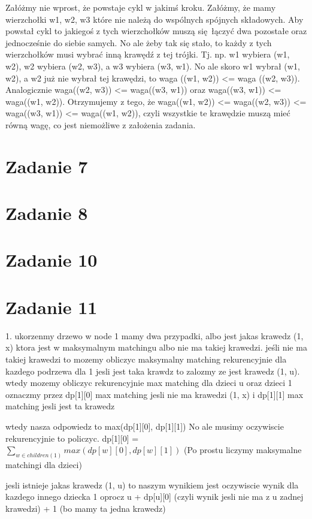 \documentclass[12pt]{article}
\begin{document}
Załóżmy nie wprost, że powstaje cykl w jakimś kroku. Załóżmy, że mamy wierzchołki w1, w2, w3 które nie należą do wspólnych spójnych składowych. Aby powstał cykl to jakiegoś z tych wierzchołków muszą się łączyć dwa pozostałe oraz jednocześnie do siebie samych. No ale żeby tak się stało, to każdy z tych wierzchołków musi wybrać inną krawędź z tej trójki. Tj. np. w1 wybiera (w1, w2), w2 wybiera (w2, w3), a w3 wybiera (w3, w1). No ale skoro w1 wybrał (w1, w2), a w2 już nie wybrał tej krawędzi, to waga ((w1, w2)) <= waga ((w2, w3)). Analogicznie waga((w2, w3)) <= waga((w3, w1)) oraz waga((w3, w1)) <= waga((w1, w2)). Otrzymujemy z tego, że waga((w1, w2)) <= waga((w2, w3)) <= waga((w3, w1)) <= waga((w1, w2)), czyli wszystkie te krawędzie muszą mieć równą wagę, co jest niemożliwe z założenia zadania.

\section{Zadanie 7}%
\section{Zadanie 8}%
\section{Zadanie 10}%

\section{Zadanie 11}%
1. ukorzenmy drzewo w node 1
mamy dwa przypadki, albo jest jakas krawedz (1, x) ktora jest w maksymalnym matchingu albo nie ma takiej krawedzi. 
jeśli nie ma takiej krawedzi to mozemy obliczyc maksymalny matching rekurencyjnie dla kazdego podrzewa dla 1
jesli jest taka krawdz to zalozmy ze jest krawedz (1, u). wtedy mozemy obliczyc rekurencyjnie max matching dla dzieci u oraz dzieci 1
oznaczmy przez dp[1][0] max matching jesli nie ma krawedzi (1, x) i dp[1][1] max matching jesli jest ta krawedz 

wtedy nasza odpowiedz to max(dp[1][0], dp[1][1])
No ale musimy oczywiscie rekurencyjnie to policzyc. 
dp[1][0] = $\sum_{w \in children(1)} max(dp[w][0], dp[w][1])$
(Po prostu liczymy maksymalne matchingi dla dzieci)

jesli istnieje jakas krawedz (1, u)
to naszym wynikiem jest oczywiscie wynik dla kazdego innego dziecka 1 oprocz u + dp[u][0] (czyli wynik jesli nie ma z u zadnej krawedzi) + 1 (bo mamy ta jedna krawedz)
 
\end{document}
